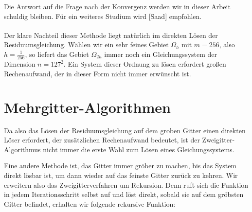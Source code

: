 Die Antwort auf die Frage nach der Konvergenz werden wir in dieser Arbeit schuldig bleiben. Für ein weiteres Studium wird [Saad] empfohlen.\\ \\

Der klare Nachteil dieser Methode liegt natürlich im direkten Lösen der Residuumsgleichung. Wählen wir ein sehr feines Gebiet $\Omega_{h}$ mit $m = 256$, also $h = \frac {1} {256}$, so liefert das Gebiet $\Omega_{2h}$ immer noch ein Gleichungssystem der Dimension $n = 127^{2}$. Ein System dieser Ordnung zu lösen erfordert großen Rechenaufwand, der in dieser Form nicht immer erwünscht ist. \\

\section{Mehrgitter-Algorithmen}\label{s.Mehrgitteralgorithmus}

Da also das Lösen der Residuumsgleichung auf dem groben Gitter einen direkten Löser erfordert, der zusätzlichen Rechenaufwand bedeutet, ist der Zweigitter-Algorithmus nicht immer die erste Wahl zum Lösen eines Gleichungssystems.

Eine andere Methode ist, das Gitter immer gröber zu machen, bis das System direkt lösbar ist, um dann wieder auf das feinste Gitter zurück zu kehren. Wir erweitern also das Zweigitterverfahren um Rekursion. Denn ruft sich die Funktion in jedem Iterationsschritt selbst auf und löst direkt, sobald sie auf dem gröbsten Gitter befindet, erhalten wir folgende rekursive Funktion:

